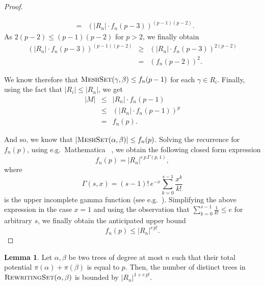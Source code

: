 \documentclass[11pt,a4paper]{amsart}
\theoremstyle{definition}
\newtheorem{lemma}[theorem]{Lemma}
\newcommand{\RewritingSet}[2]{\textsc{RewritingSet}(#1,#2)}
\newcommand{\MeshSet}[2]{\textsc{MeshSet}(#1,#2)}
\newcommand{\potential}[1]{\pi(#1)}
\newcommand{\gammaF}[1]{\Gamma(#1,1)}
\begin{document}
\begin{proof}
\begin{enumerate}[(i)]
\begin{eqnarray*}
                                 &=& {\left( |R_n| \cdot
        f_n(p-3)\right)}^{(p-1)(p-2)}.
                \end{eqnarray*}
                As
                $2 (p-2) \leq (p-1)(p-2)$ for $p > 2$, we finally obtain
				\begin{eqnarray*}
				{\left( |R_n| \cdot f_n(p-3)\right)}^{(p-1)(p-2)} &\geq& {\left(|R_n| \cdot f_n(p-3)\right)}^{2 (p-2)}\\
				&=& {(f_n(p-2))}^2.
				\end{eqnarray*}                
                
				We know therefore that $\MeshSet{\gamma}{\beta} \leq f_n(p-1)$ for 
				each $\gamma \in R_i$. Finally, using the fact that 
				$|R_i| \leq |R_n|$, we get
				\begin{eqnarray*}
                        |M| &\leq& |R_n| \cdot f_n(p-1)\\
                            &\leq& \left(|R_n| \cdot f_n(p-1)\right)^p\\
                            &=& f_n(p).
                \end{eqnarray*}
    \end{enumerate}
    And so, we know that $|\MeshSet{\alpha}{\beta}| \leq f_n(p)$. Solving the
    recurrence for $f_n(p)$, using e.g.~Mathematica \textregistered~\cite{mathematicaSoft}, we obtain the following closed form expression
    \[f_n(p) = {|R_n|}^{e\, p\, \gammaF{p}}, \]
    where
    \[ \Gamma(s,x) = (s - 1)!\, e^{-x} \sum_{k=0}^{s-1} \frac{x^k}{k!} \]
    is the upper incomplete gamma function (see e.g.~\cite{abramowitz-stegun1974}).
    Simplifying the above expression in the case $x = 1$ and using the observation
    that $\sum_{k=0}^{s-1} \frac{1}{k!} \leq e$ for arbitrary $s$, we finally
    obtain the anticipated upper bound
    \[ f_n(p) \leq {|R_n|}^{e\, p!}. \]
\end{proof}

\begin{lemma}\label{lem-rewritingset-size-upperbound}
    Let $\alpha,\beta$ be two trees of degree at most $n$ such that their total potential $\potential{\alpha} + \potential{\beta}$ is equal to $p$. Then, the number of distinct trees in $\RewritingSet{\alpha}{\beta}$ is bounded by ${|R_n|}^{1 + e\, p!}$.
\end{lemma}
\end{document}
